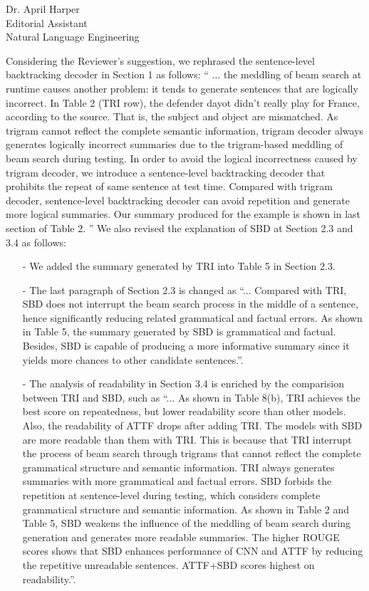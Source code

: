 \documentclass[11pt]{letter} %
\theoremstyle{definition}
\begin{document}
\begin{letter}{Dr. April Harper \\
            Editorial Assistant \\
			Natural Language Engineering}
\begin{enumerate}
\begin{itemize}
				Considering the Reviewer's suggestion, we rephrased the sentence-level backtracking decoder in Section 1 as follows:
				``
				... the meddling of beam search at runtime causes another problem: it tends to generate sentences that are logically incorrect. In Table 2 (TRI row), the defender dayot didn’t really play for France, according to the source. That is, the subject and object are mismatched. As trigram cannot reflect the complete semantic information, trigram decoder always generates logically incorrect summaries due to the trigram-based meddling of beam search during testing. In order to avoid the logical incorrectness caused by trigram decoder, we introduce a sentence-level backtracking decoder that prohibits the repeat of same sentence at test time. Compared with trigram decoder, sentence-level backtracking decoder can avoid repetition and generate more logical summaries. Our summary produced for the example is shown in last section of Table 2.
				''
			    We also revised the explanation of SBD at Section 2.3 and 3.4 as follows:
			     \begin{itemize}
			    	\item[-] We added the summary generated by TRI into Table 5 in Section 2.3.
			    	\item[-] The last paragraph of Section 2.3 is changed as ``... Compared with TRI,  SBD does not interrupt the beam search process in the middle of a sentence, hence significantly reducing related grammatical and factual errors. As shown in Table 5, the summary generated by SBD is grammatical and factual. Besides, SBD is capable of producing a more informative summary since it yields more chances to other candidate sentences.''.
			    	\item[-] The analysis of readability in Section 3.4 is enriched by the comparision between TRI and SBD, 
			    	such as ``... As shown in Table 8(b), TRI achieves the best score on repeatedness, 
			    	but lower readability score than other models. Also, the readability of ATTF drops after adding TRI.
			    	The models with SBD are more readable than them with TRI. 
			    	This is because that TRI interrupt the process of beam search through trigrams that cannot reflect the complete grammatical structure and semantic information. 
			    	TRI always generates summaries with more grammatical and factual errors. 
			    	SBD forbids the repetition at sentence-level during testing, which considers complete grammatical structure and semantic information.
			    	As shown in Table 2 and Table 5, SBD weakens the influence of the meddling of beam search during generation
			    	and generates more readable summaries.
			    	The higher ROUGE scores shows that SBD enhances performance of CNN and ATTF by reducing the repetitive unreadable sentences. ATTF+SBD scores highest on readability.''.
			    \end{itemize}
				

\end{itemize}
\end{enumerate}
\end{letter}
\end{document}
